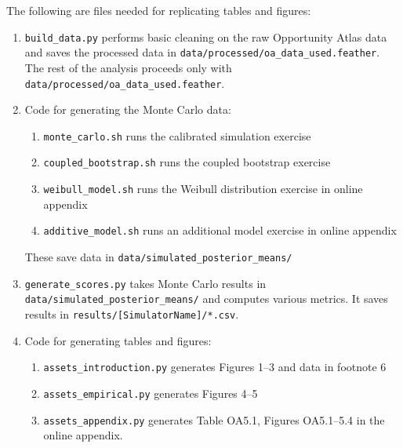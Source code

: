 \documentclass[10pt]{article}
\begin{document}
The following are files needed for replicating tables and figures:
\begin{enumerate}
\item \texttt{build\_data.py} performs basic cleaning on the raw Opportunity Atlas data
and saves the processed data in \texttt{data/processed/oa\_data\_used.feather}. The rest
of the analysis proceeds only with \texttt{data/processed/oa\_data\_used.feather}.
  \item Code for generating the Monte Carlo data:
  \begin{enumerate}
  \item \texttt{monte\_carlo.sh} runs the calibrated simulation exercise

\item \texttt{coupled\_bootstrap.sh} runs the coupled bootstrap exercise

\item \texttt{weibull\_model.sh} runs the Weibull distribution exercise in online appendix

\item \texttt{additive\_model.sh} runs an additional model exercise in online appendix
\end{enumerate}
These save data in \texttt{data/simulated\_posterior\_means/}
\item \texttt{generate\_scores.py} takes Monte Carlo results in 
\texttt{data/simulated\_posterior\_means/} and computes various metrics. It saves results
in \texttt{results/[SimulatorName]/*.csv}.
\item Code for generating tables and figures:
\begin{enumerate}
  \item \texttt{assets\_introduction.py} generates Figures 1--3 and data in footnote 6
  \item \texttt{assets\_empirical.py} generates Figures 4--5
  \item \texttt{assets\_appendix.py} generates Table OA5.1, Figures OA5.1--5.4 in the
  online appendix. 
\end{enumerate}
\end{enumerate}
\end{document}
